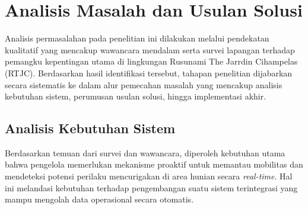     



\section{Analisis Masalah dan Usulan Solusi}
\label{sec:analisis}

Analisis permasalahan pada penelitian ini dilakukan melalui pendekatan kualitatif yang mencakup wawancara mendalam serta survei lapangan terhadap pemangku kepentingan utama di lingkungan Rusunami The Jarrdin Cihampelas (RTJC). Berdasarkan hasil identifikasi tersebut, tahapan penelitian dijabarkan secara sistematis ke dalam alur pemecahan masalah yang mencakup analisis kebutuhan sistem, perumusan usulan solusi, hingga implementasi akhir.

\subsection{Analisis Kebutuhan Sistem}
Berdasarkan temuan dari survei dan wawancara, diperoleh kebutuhan utama bahwa pengelola memerlukan mekanisme proaktif untuk memantau mobilitas dan mendeteksi potensi perilaku mencurigakan di area hunian secara \textit{real-time}. Hal ini melandasi kebutuhan terhadap pengembangan suatu sistem terintegrasi yang mampu mengolah data operasional secara otomatis.

